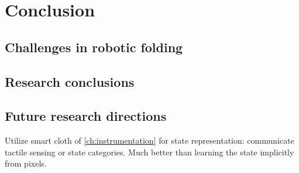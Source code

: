 \documentclass[\home/main.tex]{subfiles}
\begin{document}
\chapter{Conclusion}\label{ch:conclusion}

\section{Challenges in robotic folding}
\section{Research conclusions}
\section{Future research directions} \label{sec:conc_future_work}

Utilize smart cloth of \cref{ch:instrumentation} for state representation: communicate tactile sensing or state categories. Much better than learning the state implicitly from pixels. 
\end{document}
